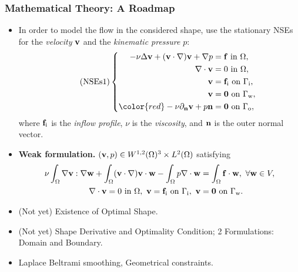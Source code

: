 \documentclass[t,xcolor=table,english]{beamer}   %
\begin{document}
\begin{frame}
	\frametitle{Mathematical Theory: A Roadmap}
	\begin{itemize}
		\item In order to model the flow in the considered shape, use the stationary NSEs for the \textit{velocity} ${\bf v}$ and the \textit{kinematic pressure} $p$:
		\begin{equation}
		\label{NSEs1}
		\tag{NSEs1}
		\left\{\begin{split}
		- \nu\Delta{\bf v} + ({\bf v}\cdot\nabla){\bf v} + \nabla p &= {\bf f} \mbox{ in } \Omega,\\
		\nabla\cdot{\bf v} &= 0 \mbox{ in } \Omega,\\
		{\bf v} &= {\bf f}_{\rm i} \mbox{ on } \Gamma_{\rm i},\\
		{\bf v} &= {\bf 0} \mbox{ on } \Gamma_{\rm w},\\
		{\color{red}-\nu\partial_{\bf n}{\bf v} + p{\bf n}} &= {\bf 0} \mbox{ on } \Gamma_{\rm o},
		\end{split}\right.
		\end{equation}
		where ${\bf f}_{\rm i}$ is the \textit{inflow profile}, $\nu$ is the \textit{viscosity}, and ${\bf n}$ is the outer normal vector.
		\item \textbf{Weak formulation.} $({\bf v},p)\in W^{1,2}(\Omega)^3\times L^2(\Omega)$ satisfying
		\begin{align*}
		\nu\int_\Omega \nabla{\bf v}:\nabla{\bf w} + \int_\Omega ({\bf v}\cdot\nabla){\bf v}\cdot{\bf w} - \int_\Omega p\nabla\cdot{\bf w} &= \int_\Omega {\bf f}\cdot{\bf w},\ \forall{\bf w}\in V,\\
		\nabla\cdot{\bf v} = 0 \mbox{ in } \Omega,\ {\bf v} = {\bf f}_{\rm i} \mbox{ on } \Gamma_{\rm i},\ {\bf v} &= {\bf 0} \mbox{ on } \Gamma_{\rm w}.
		\end{align*} 
		\item (Not yet) {\color{blue} Existence of Optimal Shape.}
		\item (Not yet) {\color{blue} Shape Derivative and Optimality Condition; 2 Formulations: Domain and Boundary.}
		\item Laplace Beltrami smoothing, Geometrical constraints.
	\end{itemize}
\end{frame}
\end{document}
